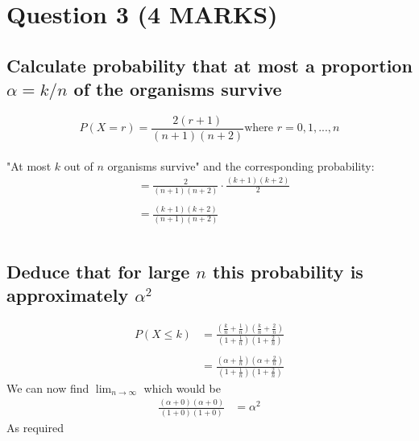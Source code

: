 \documentclass[10pt]{article}
\begin{document}
\section{Question 3 (4 MARKS)}
\subsection{Calculate probability that at most a proportion $\alpha = k/n$ of the organisms survive }
\begin{equation*}
    P(X=r) = \frac{2(r+1)}{(n+1)(n+2)}  \text{where $r = 0,1,...,n$}
\end{equation*} \\
"At most $k$ out of $n$ organisms survive" and the corresponding probability:\\
\begin{align*}
    &= \frac{2}{(n+1)(n+2)} \cdot \frac{(k+1)(k+2)}{2} \\ \\
    &= \frac{(k+1)(k+2)}{(n+1)(n+2)}\\ \\
\end{align*}

\subsection{Deduce that for large $n$ this probability is approximately $\alpha^2$}

\begin{align*}
    P(X\leq k) &= \frac{(\frac{k}{n} + \frac{1}{n})(\frac{k}{n} + \frac{2}{n})}{(1 + \frac{1}{n})(1 + \frac{2}{n})} \\ \\
    &= \frac{(\alpha + \frac{1}{n})(\alpha + \frac{2}{n})}{(1 + \frac{1}{n})(1 + \frac{2}{n})}
\end{align*}
We can now find $\lim_{n \to \infty}$ which would be
\begin{align*}
        \frac{(\alpha + 0)(\alpha + 0)}{(1 + 0)(1 + 0)}
        &= \alpha^2
\end{align*}
As required
\end{document}
